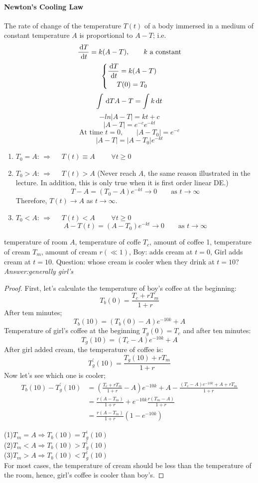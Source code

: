 \paragraph{Newton's Cooling Law}
The rate of change of the temperature $T(t)$ of a body immersed in a medium of constant temperature $A$ is proportional to $A-T$; i.e.
\[\frac{\,\mathrm{d} T}{\,\mathrm{d} t}=k(A-T), \qquad k \text{ a constant}
\]
\[\left \{	\begin{gathered}
\frac{\,\mathrm{d} T}{\,\mathrm{d} t}=k(A-T)\\
T(0)=T_0
\end{gathered}\right.\]
\[\int{\,\mathrm{d}T}{A-T}=\int k\,\mathrm{d} t
\]
\[-ln|A-T|=kt+c
\]
\[|A-T|=e^{-c}e^{-kt}
\]
\[\text{At time $t=0$,}\qquad |A-T_0|=e^{-c}
\]\[|A-T|=|A-T_0|e^{-kt}
\]
\begin{enumerate}
\item
$T_0=A$: $\Rightarrow$ $\quad T(t)\equiv A$   $\qquad\forall t\geq 0$
\item
$T_0>A$: $\Rightarrow$ $\quad T(t)>A$     (Never reach $A$, the same reason illustrated in the lecture. In addition, this is only true when it is first order linear DE.)
\[T-A=(T_0-A)e^{-kt}\rightarrow0\qquad \text{as } t\rightarrow \infty
\]
Therefore, $T(t)\rightarrow A$ as $t\rightarrow \infty$.
\item
$T_0<A$: $\Rightarrow$ $\quad T(t)< A$   $\qquad\forall t\geq 0$
\[A-T(t)=(A-T_0)e^{-kt}\rightarrow0\qquad \text{as } t\rightarrow \infty
\]
\end{enumerate}
\begin{example}
temperature of room $A$, temperature of coffe $T_c$, amount of coffee 1, temperature of cream $T_m$, amount of cream $r(\ll1)$, Boy: adds cream at $t=0$, Girl adds cream at $t=10$. Question: whose cream is cooler when they drink at $t=10$?
\emph{Answer:generally girl's}
\begin{proof}
First, let's calculate the temperature of boy's coffee at the beginning:
\[T_b(0)=\frac{T_c+rT_m}{1+r}\]
After tem minutes;
\[T_b(10)=(T_b(0)-A)e^{-10k}+A
\]
Temperature of girl's coffee at the beginning $T_g(0)=T_c$ and after ten minutes:
\[T_g(10)=(T_c-A)e^{-10k}+A
\]
After girl added cream, the temperature of coffee is:
\[T_g^\prime(10)=\frac{T_g(10)+rT_m}{1+r}
\]
Now let's see which one is cooler;
\[\begin{aligned}T_b(10)-T_g^\prime(10)&=(\frac{T_c+rT_m}{1+r}-A)e^{-10k}+A-\frac{(T_c-A)e^{-10k}+A+rT_m}{1+r}\\
&=\frac{r(A-T_m)}{1+r}+e^{-10k}\frac{r(T_m-A)}{1+r}\\
&=\frac{r(A-T_m)}{1+r}(1-e^{-10k})
\end{aligned}
\]

(1)$T_m=A \Rightarrow T_b(10)=T_g^\prime(10)$\\
(2)$T_m<A \Rightarrow T_b(10)>T_g^\prime(10)$\\
(3)$T_m>A \Rightarrow T_b(10)<T_g^\prime(10)$\\
For most cases, the temperature of cream should be less than the temperature of the room, hence, girl's coffee is cooler than boy's.
\end{proof}
\end{example}